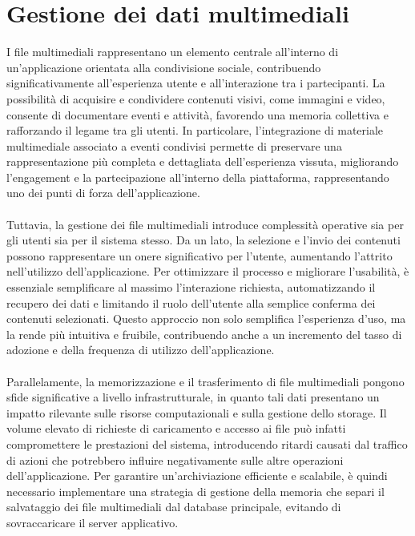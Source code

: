 \section{Gestione dei dati multimediali}

I file multimediali rappresentano un elemento centrale all’interno di un’applicazione orientata alla condivisione sociale,
contribuendo significativamente all’esperienza utente e all’interazione tra i partecipanti.
La possibilità di acquisire e condividere contenuti visivi, come immagini e video, consente di documentare eventi e attività,
favorendo una memoria collettiva e rafforzando il legame tra gli utenti.
In particolare, l’integrazione di materiale multimediale associato a eventi condivisi permette di preservare una rappresentazione più completa e dettagliata dell’esperienza vissuta,
migliorando l’engagement e la partecipazione all’interno della piattaforma, rappresentando uno dei punti di forza dell’applicazione.\\
\\
Tuttavia, la gestione dei file multimediali introduce complessità operative sia per gli utenti sia per il sistema stesso.
Da un lato, la selezione e l’invio dei contenuti possono rappresentare un onere significativo per l’utente, aumentando l’attrito nell’utilizzo dell’applicazione.
Per ottimizzare il processo e migliorare l’usabilità, è essenziale semplificare al massimo l’interazione richiesta,
automatizzando il recupero dei dati e limitando il ruolo dell’utente alla semplice conferma dei contenuti selezionati.
Questo approccio non solo semplifica l’esperienza d’uso, ma la rende più intuitiva e fruibile,
contribuendo anche a un incremento del tasso di adozione e della frequenza di utilizzo dell’applicazione.\\
\\
Parallelamente, la memorizzazione e il trasferimento di file multimediali pongono sfide significative a livello infrastrutturale,
in quanto tali dati presentano un impatto rilevante sulle risorse computazionali e sulla gestione dello storage.
Il volume elevato di richieste di caricamento e accesso ai file può infatti compromettere le prestazioni del sistema,
introducendo ritardi causati dal traffico di azioni che potrebbero influire negativamente sulle altre operazioni dell’applicazione.
Per garantire un’archiviazione efficiente e scalabile, è quindi necessario implementare una strategia di gestione della memoria
che separi il salvataggio dei file multimediali dal database principale, evitando di sovraccaricare il server applicativo.
